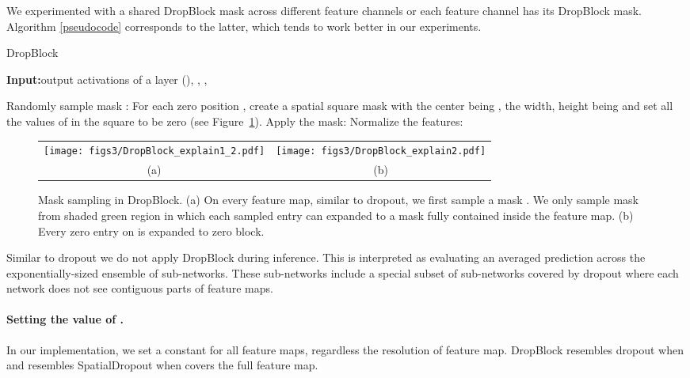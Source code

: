 \documentclass{article}
\begin{document}
We experimented with a shared DropBlock mask across different feature channels or each feature channel has its DropBlock mask. Algorithm \ref{pseudocode} corresponds to the latter, which tends to work better in our experiments.

\begin{algorithm}[t!]
\renewcommand{\algorithmicrequire}{\textbf{Input:}}
\renewcommand{\algorithmicensure}{\textbf{Output:}}
\caption{DropBlock}\label{pseudocode}
\begin{algorithmic}[1]
\State \algorithmicrequire output activations of a layer (), , , 


\EndIf

\State Randomly sample mask : 
\State For each zero position , create a spatial square  mask with the center being , the width, height being  and set all the values of  in the square to be zero (see Figure~\ref{fig:expand}).
\State Apply the mask: 
\State Normalize the features: 
\end{algorithmic}
\end{algorithm}

\begin{figure}[t!]
  \centering
  \begin{tabular}{cc}
      \texttt{[image: figs3/DropBlock\_explain1\_2.pdf]}&
      \texttt{[image: figs3/DropBlock\_explain2.pdf]}\\
      (a) & (b)\\
  \end{tabular}
  
  \caption{Mask sampling in DropBlock. (a) On every feature map, similar to dropout, we first sample a mask . We only sample mask from shaded green region in which each sampled entry can expanded to a mask fully contained inside the feature map. (b) Every zero entry on  is expanded to  zero block.}
  \label{fig:expand}
\end{figure}

Similar to dropout we do not apply DropBlock during inference. This is interpreted as evaluating
an averaged prediction across the exponentially-sized ensemble of sub-networks. These
sub-networks include a special subset of sub-networks covered by dropout where each network
does not see contiguous parts of feature maps.

\paragraph{Setting the value of .} In our implementation, we set a constant  for all feature maps, regardless the resolution of feature map. DropBlock resembles dropout \cite{dropout2014} when  and resembles SpatialDropout \cite{tompson2015spatialdropout} when  covers the full feature map.
\end{document}
